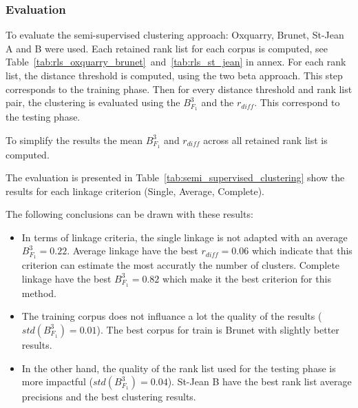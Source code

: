 \subsubsection{Evaluation}

To evaluate the semi-supervised clustering approach: Oxquarry, Brunet, St-Jean A and B were used.
Each retained rank list for each corpus is computed, see Table~\ref{tab:rls_oxquarry_brunet}~and~\ref{tab:rls_st_jean} in annex.
For each rank list, the distance threshold is computed, using the two beta approach.
This step corresponds to the training phase.
Then for every distance threshold and rank list pair, the clustering is evaluated using the $B^3_{F_1}$ and the $r_{diff}$.
This correspond to the testing phase.

To simplify the results the mean $B^3_{F_1}$ and $r_{diff}$ across all retained rank list is computed.

The evaluation is presented in Table~\ref{tab:semi_supervised_clustering} show the results for each linkage criterion (Single, Average, Complete).

The following conclusions can be drawn with these results:
\begin{itemize}
  \item
  In terms of linkage criteria, the single linkage is not adapted with an average $B^3_{F_1} = 0.22$.
  Average linkage have the best $r_{diff} = 0.06$ which indicate that this criterion can estimate the most accuratly the number of clusters.
  Complete linkage have the best $B^3_{F_1} = 0.82$ which make it the best criterion for this method.
  \item
  The training corpus does not influance a lot the quality of the results ($std(B^3_{F_1}) = 0.01$).
  The best corpus for train is Brunet with slightly better results.
  \item
  In the other hand, the quality of the rank list used for the testing phase is more impactful ($std(B^3_{F_1}) = 0.04$).
  St-Jean B have the best rank list average precisions and the best clustering results.
\end{itemize}

